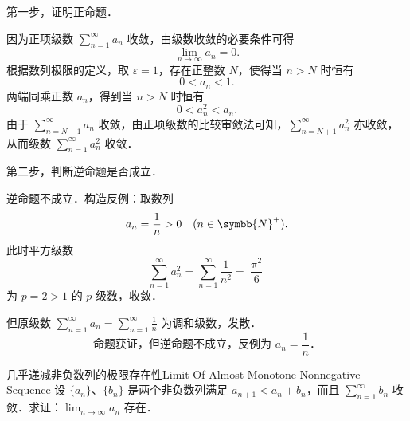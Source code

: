 \begin{solution}
    第一步，证明正命题．

    因为正项级数 $\sum_{n=1}^\infty a_n$ 收敛，由级数收敛的必要条件可得
    \begin{equation}
        \lim_{n\to\infty} a_n = 0.
    \end{equation}
    根据数列极限的定义，取 $\varepsilon = 1$，存在正整数 $N$，使得当 $n > N$ 时恒有
    \begin{equation}
        0 < a_n < 1.
    \end{equation}
    两端同乘正数 $a_n$，得到当 $n > N$ 时恒有
    \begin{equation}
        0 < a_n^2 < a_n.
    \end{equation}
    由于 $\sum_{n=N+1}^\infty a_n$ 收敛，由正项级数的比较审敛法可知，$\sum_{n=N+1}^\infty a_n^2$ 亦收敛，从而级数 $\sum_{n=1}^\infty a_n^2$ 收敛．

    第二步，判断逆命题是否成立．

    逆命题不成立．构造反例：取数列
    \begin{equation}
        a_n = \frac{1}{n} > 0 \quad (n \in \symbb{N}^+).
    \end{equation}
    此时平方级数
    \begin{equation}
        \sum_{n=1}^\infty a_n^2 = \sum_{n=1}^\infty \frac{1}{n^2} = \frac{\uppi^2}{6}
    \end{equation}
    为 $p = 2 > 1$ 的 $p$-级数，收敛．

    但原级数 $\sum_{n=1}^\infty a_n = \sum_{n=1}^\infty \frac{1}{n}$ 为调和级数，发散．
    \begin{equation}
        \boxed{\text{命题获证，但逆命题不成立，反例为 } a_n = \frac{1}{n}．}
    \end{equation}
\end{solution}

\begin{problem}{几乎递减非负数列的极限存在性}{Limit-Of-Almost-Monotone-Nonnegative-Sequence}
    设 $\{a_n\}$、$\{b_n\}$ 是两个非负数列满足 $a_{n+1} < a_n + b_n$，而且 $\sum_{n=1}^\infty b_n$ 收敛．求证：$\lim_{n\to\infty} a_n$ 存在．
\end{problem}

